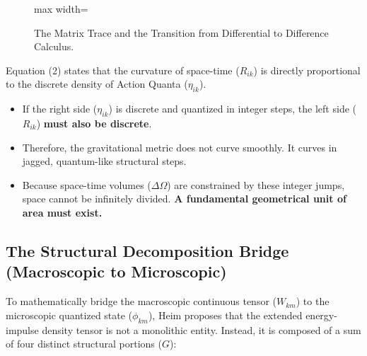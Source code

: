 \documentclass[11pt,a4paper,oneside]{article}
\begin{document}
\begin{figure}[htbp]
\begin{adjustbox}{max width=\textwidth}
\end{adjustbox}
\caption{The Matrix Trace and the Transition from Differential to Difference Calculus.}
\end{figure}

\begin{tcolorbox}[colback=white, colframe=theoryred, title=\textbf{The Paradigm Shift of Equation 2}]
Equation (2) states that the curvature of space-time ($R_{ik}$) is directly proportional to the discrete density of Action Quanta ($\eta_{ik}$). 
\begin{itemize}
    \item If the right side ($\eta_{ik}$) is discrete and quantized in integer steps, the left side ($R_{ik}$) \textbf{must also be discrete}. 
    \item Therefore, the gravitational metric does not curve smoothly. It curves in jagged, quantum-like structural steps.
    \item Because space-time volumes ($\Delta \Omega$) are constrained by these integer jumps, space cannot be infinitely divided. \textbf{A fundamental geometrical unit of area must exist.}
\end{itemize}
\end{tcolorbox}
\subsection{The Structural Decomposition Bridge (Macroscopic to Microscopic)}

To mathematically bridge the macroscopic continuous tensor ($W_{km}$) to the microscopic quantized state ($\phi_{km}$), Heim proposes that the extended energy-impulse density tensor is not a monolithic entity. Instead, it is composed of a sum of four distinct structural portions ($G$):
\end{document}
